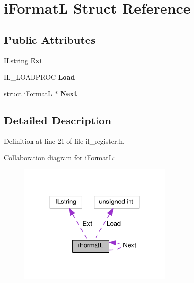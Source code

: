 \hypertarget{structiFormatL}{}\section{i\+FormatL Struct Reference}
\label{structiFormatL}
\subsection*{Public Attributes}
\begin{DoxyCompactItemize}
\item 
\mbox{\label{structiFormatL_a99ea0c07caa584255c624d9cd7e6223c}} 
I\+Lstring {\bfseries Ext}
\item 
\mbox{\label{structiFormatL_afcb9c878fadbefdf8f65a0184afd7b43}} 
I\+L\+\_\+\+L\+O\+A\+D\+P\+R\+OC {\bfseries Load}
\item 
\mbox{\label{structiFormatL_a80d700aa471c5391f5165e9ee8a5d497}} 
struct \hyperlink{structiFormatL}{i\+FormatL} $\ast$ {\bfseries Next}
\end{DoxyCompactItemize}


\subsection{Detailed Description}


Definition at line 21 of file il\+\_\+register.\+h.



Collaboration diagram for i\+FormatL\+:
\nopagebreak
\begin{figure}[H]
\begin{center}
\leavevmode
\includegraphics[width=216pt]{d3/d03/structiFormatL__coll__graph}
\end{center}
\end{figure}


